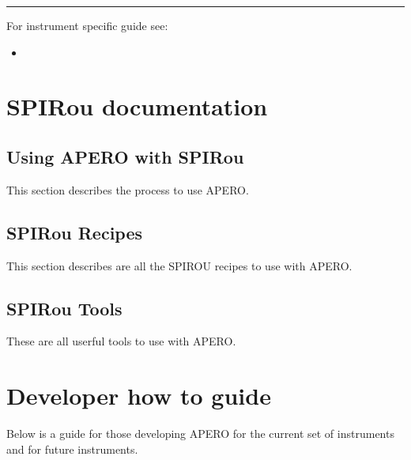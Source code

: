 \documentclass[a4paper,10pt,english]{report}
\begin{document}
\bigskip\hrule\bigskip


For instrument specific guide see:
\begin{itemize}
\item {} 
{\hyperref[\detokenize{user/spirou:spirou-main}]{}}

\end{itemize}


\chapter{SPIRou documentation}
\label{\detokenize{user/spirou:spirou-documentation}}\label{\detokenize{user/spirou:spirou-main}}\label{\detokenize{user/spirou::doc}}

\section{Using APERO with SPIRou}
\label{\detokenize{user/spirou/using_apero_spirou:using-apero-with-spirou}}\label{\detokenize{user/spirou/using_apero_spirou:using-apero-spirou}}\label{\detokenize{user/spirou/using_apero_spirou::doc}}
This section describes the process to use APERO.


\section{SPIRou Recipes}
\label{\detokenize{user/spirou/recipes_spirou:spirou-recipes}}\label{\detokenize{user/spirou/recipes_spirou:recipes-spirou}}\label{\detokenize{user/spirou/recipes_spirou::doc}}
This section describes are all the SPIROU recipes to use with APERO.


\section{SPIRou Tools}
\label{\detokenize{user/spirou/tools_spirou:spirou-tools}}\label{\detokenize{user/spirou/tools_spirou:tools-spirou}}\label{\detokenize{user/spirou/tools_spirou::doc}}
These are all userful tools to use with APERO.


\chapter{Developer how to guide}
\label{\detokenize{dev/developer_guide:developer-how-to-guide}}\label{\detokenize{dev/developer_guide:dev-main}}\label{\detokenize{dev/developer_guide::doc}}
Below is a guide for those developing APERO for the current set of instruments
and for future instruments.
\end{document}
